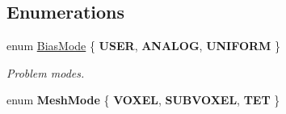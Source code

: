 \subsection*{Enumerations}
\begin{DoxyCompactItemize}
\item 
\mbox{\label{namespacepyne_af75379f8cb942a7e996031ee50115fb5}} 
enum \hyperlink{namespacepyne_af75379f8cb942a7e996031ee50115fb5}{Bias\+Mode} \{ {\bfseries U\+S\+ER}, 
{\bfseries A\+N\+A\+L\+OG}, 
{\bfseries U\+N\+I\+F\+O\+RM}
 \}\begin{DoxyCompactList}\small\item\em Problem modes. \end{DoxyCompactList}
\item 
\mbox{\label{namespacepyne_a8b9ac539782acf6d43b43f113e39b64b}} 
enum {\bfseries Mesh\+Mode} \{ {\bfseries V\+O\+X\+EL}, 
{\bfseries S\+U\+B\+V\+O\+X\+EL}, 
{\bfseries T\+ET}
 \}
\end{DoxyCompactItemize}
